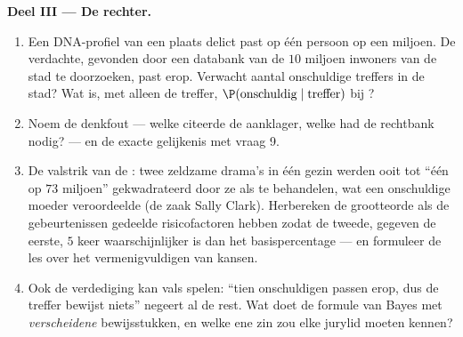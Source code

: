 \begin{problem}
\medskip
\noindent\textbf{Deel III --- De rechter.}
\begin{enumerate}[resume]
  \item Een DNA-profiel van een plaats delict past op één persoon op een
        miljoen. De verdachte, gevonden door een databank van de $10$ miljoen
        inwoners van de stad te doorzoeken, past erop. Verwacht aantal
        onschuldige treffers in de stad? Wat is, met alleen de treffer,
        $\P(\text{onschuldig} \mid \text{treffer})$ bij ?
  \item Noem de denkfout --- welke  citeerde de aanklager, welke had de
        rechtbank nodig? --- en de exacte gelijkenis met vraag 9.
  \item De valstrik van de : twee zeldzame drama's in één
        gezin werden ooit tot ``één op $73$ miljoen'' gekwadrateerd door ze als
         te behandelen, wat een onschuldige moeder veroordeelde
        (de zaak Sally Clark). Herbereken de grootteorde als de gebeurtenissen
        gedeelde risicofactoren hebben zodat de tweede, gegeven de eerste, $5$
        keer waarschijnlijker is dan het basispercentage --- en formuleer de
        les over het vermenigvuldigen van kansen.
  \item Ook de verdediging kan vals spelen: ``tien onschuldigen passen erop,
        dus de treffer bewijst niets'' negeert al de rest. Wat doet de formule
        van Bayes met \emph{verscheidene} bewijsstukken, en welke ene zin zou
        elke jurylid moeten kennen?
\end{enumerate}


\end{problem}
